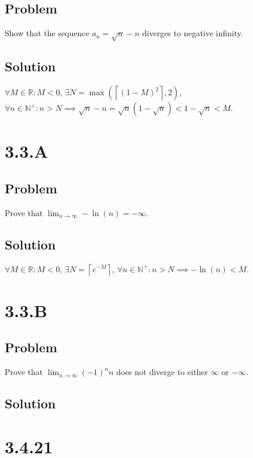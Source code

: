 \documentclass[12pt]{article}
\newcommand{\round}[1]{\left(       #1 \right)      }
\newcommand{\ceil} [1]{\left\lceil  #1 \right\rceil }
\newcommand{\R}    [0]{\mathbb{R}                   }
\newcommand{\N}    [0]{\mathbb{N}                   }
\begin{document}
\subsection*{Problem}
Show that the sequence $a_n = \sqrt{n} - n$ diverges to negative infinity.

\subsection*{Solution}
$\forall M \in \R : M < 0$, $\exists N = \max\round{\ceil{(1-M)^2}, 2}$, $\forall n \in \N^+ : n > N \implies \sqrt{n} - n = \sqrt{n} \round{1 - \sqrt{n}} < 1 - \sqrt{n} < M$.




\section*{3.3.A}

\subsection*{Problem}
Prove that $\lim_{n \to \infty} -\ln(n) = -\infty$.

\subsection*{Solution}
$\forall M \in \R : M < 0$, $\exists N = \ceil{e^{-M}}$, $\forall n \in \N^+ : n > N \implies -\ln(n) < M$.



\section*{3.3.B}

\subsection*{Problem}
Prove that $\lim_{n \to \infty} (-1)^{n} n$ does not diverge to either $\infty$ or $-\infty$.

\subsection*{Solution}



\section*{3.4.21}
\end{document}
